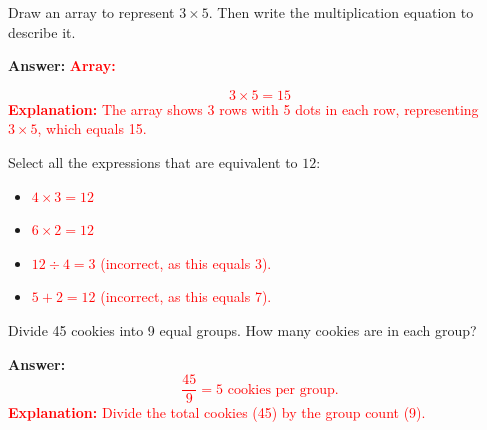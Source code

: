 \documentclass[12pt]{article}
\begin{document}
\begin{tcolorbox}[colframe=black!50, colback=white, title=\textbf{Problem 4}]
Draw an array to represent \(3 \times 5\). Then write the multiplication equation to describe it.

\textbf{Answer:}  
\textcolor{red}{\textbf{Array:}}  

\begin{center}
\end{center}

\textcolor{red}{\[
3 \times 5 = 15
\]}  
\textcolor{red}{\textbf{Explanation:} The array shows 3 rows with 5 dots in each row, representing \(3 \times 5\), which equals 15.}
\end{tcolorbox}

\begin{tcolorbox}[colframe=black!50, colback=white, title=\textbf{Problem 5}]
Select all the expressions that are equivalent to \(12\):  

\begin{itemize}[label=$\Box$]
    \item \textcolor{red}{\(4 \times 3 = 12\) \checkmark}
    \item \textcolor{red}{\(6 \times 2 = 12\) \checkmark}
    \item \textcolor{red}{\(12 \div 4 = 3\) \texttimes (incorrect, as this equals 3).}
    \item \textcolor{red}{\(5 + 2 = 12\) \texttimes (incorrect, as this equals 7).}
\end{itemize}
\end{tcolorbox}

\begin{tcolorbox}[colframe=black!50, colback=white, title=\textbf{Problem 6}]
Divide 45 cookies into 9 equal groups. How many cookies are in each group?  

\textbf{Answer:}  
\textcolor{red}{\[
\frac{45}{9} = 5 \text{ cookies per group.}
\]}  
\textcolor{red}{\textbf{Explanation:} Divide the total cookies (45) by the group count (9).}
\end{tcolorbox}
\end{document}

